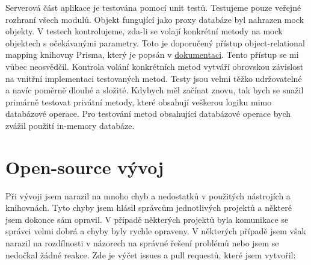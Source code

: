 Serverová část aplikace je testována pomocí unit testů.
Testujeme pouze veřejné rozhraní všech modulů.
Objekt fungující jako proxy databáze byl nahrazen mock objekty.
V testech kontrolujeme, zda-li se volají konkrétní metody na mock objektech s očekávanými parametry.
Toto je doporučený přístup object-relational mapping knihovny Prisma, který je popsán v \href{https://www.prisma.io/docs/guides/testing/unit-testing}{dokumentaci}.
Tento přístup se mi vůbec neosvědčil.
Kontrola volání konkrétních metod vytváří obrovskou závislost na vnitřní implementaci testovaných metod.
Testy jsou velmi těžko udržovatelné a navíc poměrně dlouhé a složité.
Kdybych měl začínat znovu, tak bych se snažil primárně testovat privátní metody, které obsahují veškerou logiku mimo databázové operace.
Pro testování metod obsahující databázové operace bych zvážil použití in-memory databáze.


\section{Open-source vývoj}\label{sec:open-source-vyvoj}

Při vývoji jsem narazil na mnoho chyb a nedostatků v použitých nástrojích a knihovnách.
Tyto chyby jsem hlásil správcům jednotlivých projektů a některé jsem dokonce sám opravil.
V případě některých projektů byla komunikace se správci velmi dobrá a chyby byly rychle opraveny.
V některých případě jsem však narazil na rozdílnosti v názorech na správné řešení problémů nebo jsem se nedočkal žádné reakce.
Zde je výčet issues a pull requestů, které jsem vytvořil:

